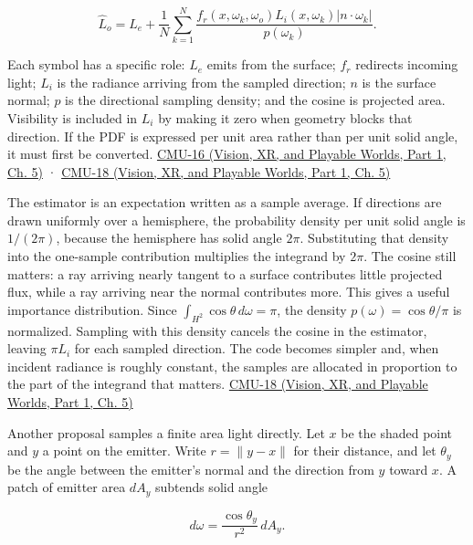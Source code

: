 \[
\widehat L_o=L_e+\frac1N\sum_{k=1}^N\frac{f_r(x,\omega_k,\omega_o)L_i(x,\omega_k)|n\cdot\omega_k|}{p(\omega_k)}.
\]

Each symbol has a specific role: \(L_e\) emits from the surface; \(f_r\) redirects incoming light; \(L_i\) is the radiance arriving from the sampled direction; \(n\) is the surface normal; \(p\) is the directional sampling density; and the cosine is projected area. Visibility is included in \(L_i\) by making it zero when geometry blocks that direction. If the PDF is expressed per unit area rather than per unit solid angle, it must first be converted. \href{../07-Vision-XR-and-Playable-Worlds-P01/main.pdf\#04-visual-computing-ii-ch036-cmu-16---the-rendering-equation}{CMU-16 (Vision, XR, and Playable Worlds, Part 1, Ch. 5)} · \href{../07-Vision-XR-and-Playable-Worlds-P01/main.pdf\#04-visual-computing-ii-ch036-cmu-18---monte-carlo-rendering}{CMU-18 (Vision, XR, and Playable Worlds, Part 1, Ch. 5)}

The estimator is an expectation written as a sample average. If directions are drawn uniformly over a hemisphere, the probability density per unit solid angle is \(1/(2\pi)\), because the hemisphere has solid angle \(2\pi\). Substituting that density into the one-sample contribution multiplies the integrand by \(2\pi\). The cosine still matters: a ray arriving nearly tangent to a surface contributes little projected flux, while a ray arriving near the normal contributes more. This gives a useful importance distribution. Since \(\int_{H^2}\cos\theta\,d\omega=\pi\), the density \(p(\omega)=\cos\theta/\pi\) is normalized. Sampling with this density cancels the cosine in the estimator, leaving \(\pi L_i\) for each sampled direction. The code becomes simpler and, when incident radiance is roughly constant, the samples are allocated in proportion to the part of the integrand that matters. \href{../07-Vision-XR-and-Playable-Worlds-P01/main.pdf\#04-visual-computing-ii-ch036-cmu-18---monte-carlo-rendering}{CMU-18 (Vision, XR, and Playable Worlds, Part 1, Ch. 5)}

Another proposal samples a finite area light directly. Let \(x\) be the shaded point and \(y\) a point on the emitter. Write \(r=\|y-x\|\) for their distance, and let \(\theta_y\) be the angle between the emitter's normal and the direction from \(y\) toward \(x\). A patch of emitter area \(dA_y\) subtends solid angle

\[
d\omega = \frac{\cos\theta_y}{r^2}\,dA_y.
\]

